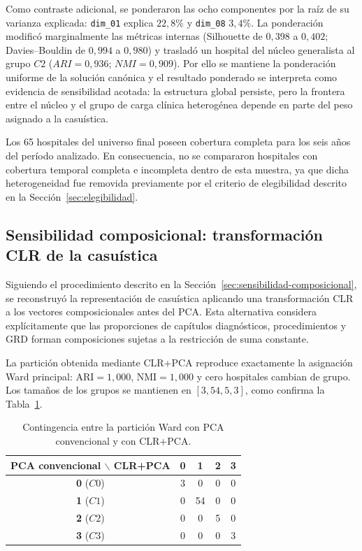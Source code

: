 Como contraste adicional, se ponderaron las ocho componentes por la raíz de su
varianza explicada: \texttt{dim\_01} explica $22{,}8\%$ y \texttt{dim\_08}
$3{,}4\%$. La ponderación modificó marginalmente las métricas internas (Silhouette
de $0{,}398$ a $0{,}402$; Davies--Bouldin de $0{,}994$ a $0{,}980$) y trasladó un
hospital del núcleo generalista al grupo $C2$ ($ARI=0{,}936$; $NMI=0{,}909$). Por
ello se mantiene la ponderación uniforme de la solución canónica y el resultado
ponderado se interpreta como evidencia de sensibilidad acotada: la estructura
global persiste, pero la frontera entre el núcleo y el grupo de carga clínica
heterogénea depende en parte del peso asignado a la casuística.

Los 65 hospitales del universo final poseen cobertura completa para los seis años del período analizado. En consecuencia, no se compararon hospitales con cobertura temporal completa e incompleta dentro de esta muestra, ya que dicha heterogeneidad fue removida previamente por el criterio de elegibilidad descrito en la Sección~\ref{sec:elegibilidad}.

\subsection*{Sensibilidad composicional: transformación CLR de la casuística}

Siguiendo el procedimiento descrito en la Sección~\ref{sec:sensibilidad-composicional}, se reconstruyó la representación de casuística aplicando una transformación CLR a los vectores composicionales antes del PCA. Esta alternativa considera explícitamente que las proporciones de capítulos diagnósticos, procedimientos y GRD forman composiciones sujetas a la restricción de suma constante.

La partición obtenida mediante CLR+PCA reproduce exactamente la asignación Ward principal: $\text{ARI}=1{,}000$, $\text{NMI}=1{,}000$ y cero hospitales cambian de grupo. Los tamaños de los grupos se mantienen en $[3,54,5,3]$, como confirma la Tabla~\ref{tab:contingencia-clr}.

\begin{table}[htbp]
\centering
\caption{Contingencia entre la partición Ward con PCA convencional y con CLR+PCA.}
\label{tab:contingencia-clr}
\begin{tabular}{c c c c c}
\toprule
\textbf{PCA convencional $\backslash$ CLR+PCA} & \textbf{0} & \textbf{1} & \textbf{2} & \textbf{3} \\
\midrule
\textbf{0} ($C0$) & 3 & 0 & 0 & 0 \\
\textbf{1} ($C1$) & 0 & 54 & 0 & 0 \\
\textbf{2} ($C2$) & 0 & 0 & 5 & 0 \\
\textbf{3} ($C3$) & 0 & 0 & 0 & 3 \\
\bottomrule
\end{tabular}
\end{table}

